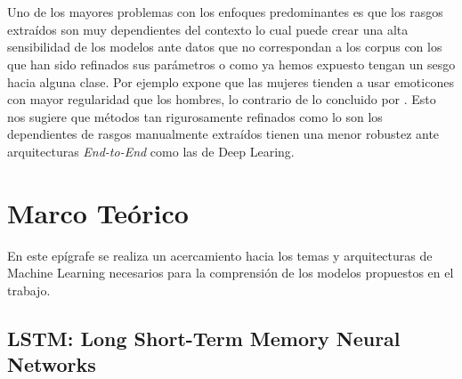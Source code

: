 \\\\
Uno de los mayores problemas con los enfoques predominantes es que los rasgos extraídos son muy dependientes del contexto lo cual puede crear una alta sensibilidad de los modelos ante datos que no correspondan a los corpus con los que han sido refinados sus parámetros o como ya hemos expuesto tengan un sesgo hacia alguna clase. Por ejemplo \citep{Newman2008GenderDI} expone que las mujeres tienden a usar emoticones con mayor regularidad que los hombres, lo contrario de lo concluido por \citep{Schwartz2013PersonalityGA}. Esto nos sugiere que métodos tan rigurosamente refinados como lo son los dependientes de rasgos manualmente extraídos tienen una menor robustez ante arquitecturas \textit{End-to-End} como las de Deep Learing.

\section{Marco Teórico}

En este epígrafe se realiza un acercamiento hacia los temas y arquitecturas de Machine Learning necesarios para la comprensión de los modelos propuestos en el trabajo.

\subsection{LSTM: Long Short-Term Memory Neural Networks}

